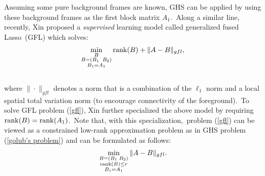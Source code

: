 \documentclass[10pt,twocolumn,letterpaper]{article}
\begin{document}
Assuming some pure background frames are known, GHS can be applied
by using these background frames as the first block matrix $A_1$.~Along a similar line, recently, Xin \etal\cite{xin2015} proposed a
{\it supervised} learning model called generalized fused Lasso~(GFL)
which solves:
 ~\\[-0.2in]
\begin{align}\label{gfl}
\min_{\substack{B\\B=(B_1\;\;B_2)\\B_1=A_1}}{\rm rank}(B)+\|A-B\|_{gfl},
\end{align}
~\\[-0.1in]
where $\|\cdot\|_{gfl}$ denotes a norm that is a combination of the
$\ell_1$ norm and a local spatial total variation norm (to encourage
connectivity of the foreground).~To solve GFL problem (\ref{gfl}),
Xin \etal\cite{xin2015} further specialized the above model by
requiring ${\rm rank}(B)={\rm rank}(A_1)$.~Note that, with this
specialization,~problem (\ref{gfl}) can be viewed as a constrained
low-rank approximation problem as in GHS problem (\ref{golub's
problem}) and can be formulated as follows:
 ~\\[-0.12in]
\begin{equation}\label{gfl_golub}
\min_{\substack{B = (B_1\;B_2)\\{\rm rank}(B)\le r\\B_1=A_1}} \|A-B\|_{gfl}.
\end{equation}
 ~\\[-0.2in]

\vspace{-0.0in}
\end{document}

